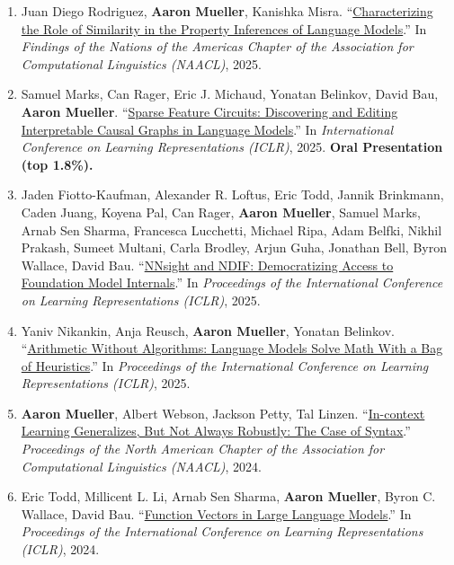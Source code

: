 \documentclass[10pt]{article}
\providecommand*\titlelink[2]{\href{#1}{\textcolor{accent}{#2}}}
\begin{document}
\begin{enumerate}[leftmargin=*, topsep=0pt, itemsep=0.25ex, partopsep=0ex, parsep=1ex, label=C\arabic*., ref=C\arabic*]
	\item Juan Diego Rodriguez, \textbf{Aaron Mueller}, Kanishka Misra. ``\titlelink{https://arxiv.org/abs/2410.22590v1}{Characterizing the Role of Similarity in the Property Inferences of Language Models}.'' In \emph{Findings of the Nations of the Americas Chapter of the Association for Computational Linguistics (NAACL)}, 2025.\label{pub:property-inferences}
	
	\item Samuel Marks, Can Rager, Eric J. Michaud, Yonatan Belinkov, David Bau, \textbf{Aaron Mueller}. ``\titlelink{https://arxiv.org/abs/2403.19647}{Sparse Feature Circuits: Discovering and Editing Interpretable Causal Graphs in Language Models}.'' In \emph{International Conference on Learning Representations (ICLR)}, 2025. \textbf{\textcolor{accent}{Oral Presentation (top 1.8\%).}}\label{pub:feature-circuits}

	\item Jaden Fiotto-Kaufman, Alexander R. Loftus, Eric Todd, Jannik Brinkmann, Caden Juang, Koyena Pal, Can Rager, \textbf{Aaron Mueller}, Samuel Marks, Arnab Sen Sharma, Francesca Lucchetti, Michael Ripa, Adam Belfki, Nikhil Prakash, Sumeet Multani, Carla Brodley, Arjun Guha, Jonathan Bell, Byron Wallace, David Bau. ``\titlelink{https://arxiv.org/abs/2407.14561}{NNsight and NDIF: Democratizing Access to Foundation Model Internals}.'' In \emph{Proceedings of the International Conference on Learning Representations (ICLR)}, 2025.

	\item Yaniv Nikankin, Anja Reusch, \textbf{Aaron Mueller}, Yonatan Belinkov. ``\titlelink{https://arxiv.org/abs/2410.21272}{Arithmetic Without Algorithms: Language Models Solve Math With a Bag of Heuristics}.'' In \emph{Proceedings of the International Conference on Learning Representations (ICLR)}, 2025.\label{pub:math-boh}
	
	\item \textbf{Aaron Mueller}, Albert Webson, Jackson Petty, Tal Linzen. ``\titlelink{https://arxiv.org/abs/2311.07811}{In-context Learning Generalizes, But Not Always Robustly: The Case of Syntax}.'' \emph{Proceedings of the North American Chapter of the Association for Computational Linguistics (NAACL)}, 2024.\label{pub:icl-ood}
	
	\item Eric Todd, Millicent L. Li, Arnab Sen Sharma, \textbf{Aaron Mueller}, Byron C. Wallace, David Bau. ``\titlelink{https://arxiv.org/abs/2310.15213}{Function Vectors in Large Language Models}.'' In \emph{Proceedings of the International Conference on Learning Representations (ICLR)}, 2024.\label{pub:function-vectors}
		

\end{enumerate}
\end{document}
